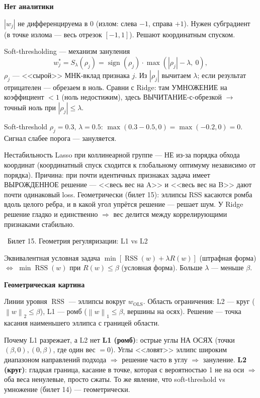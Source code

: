 \documentclass[12pt, a4paper]{article}
\newcommand{\bilet}[2]{%
  \vspace{10pt}%
  \noindent\colorbox{qcolor}{\parbox{\dimexpr\linewidth-2\fboxsep\relax}{%
    \color{white}\large\bfseries\strut\ Билет #1. #2%
  }}%
  \nopagebreak\vspace{5pt}\par\nopagebreak%
}
\newcommand{\qsub}[1]{%
  \vspace{5pt}%
  {\bfseries\color{defblue} #1}%
  \par\vspace{2pt}%
}
\newcommand{\sign}{\operatorname{sign}}
\newcommand{\RSS}{\operatorname{RSS}}
\newcommand{\norm}[1]{\left\lVert #1 \right\rVert}
\begin{document}
\qsub{Нет аналитики}
$|w_j|$ не дифференцируема в $0$ (излом: слева $-1$, справа $+1$). Нужен субградиент (в точке излома --- весь отрезок $[-1,1]$). Решают координатным спуском.

\begin{propbox}{Soft-thresholding --- механизм зануления}
\[
  w_j^* = S_\lambda(\rho_j) = \sign(\rho_j)\cdot\max(|\rho_j| - \lambda,\ 0),
\]
$\rho_j$ --- <<сырой>> МНК-вклад признака $j$. Из $|\rho_j|$ вычитаем $\lambda$; если результат отрицателен --- обрезаем в ноль. Сравни с Ridge: там УМНОЖЕНИЕ на коэффициент $< 1$ (ноль недостижим), здесь ВЫЧИТАНИЕ-с-обрезкой $\to$ точный ноль при $|\rho_j| \le \lambda$.
\end{propbox}

\begin{exbox}{Soft-threshold}
$\rho_j = 0.3$, $\lambda = 0.5$: $\max(0.3 - 0.5, 0) = \max(-0.2, 0) = 0$. Сигнал слабее порога --- зануляется.
\end{exbox}

\begin{fishkabox}
Нестабильность Lasso при коллинеарной группе --- НЕ из-за порядка обхода координат (координатный спуск сходится к глобальному оптимуму независимо от порядка). Причина: при почти идентичных признаках задача имеет ВЫРОЖДЕННОЕ решение --- <<весь вес на A>> и <<весь вес на B>> дают почти одинаковый loss. Геометрически (билет 15): эллипсы RSS касаются ромба вдоль целого ребра, и в какой угол упрётся решение --- решает шум. У Ridge решение гладко и единственно $\Rightarrow$ вес делится между коррелирующими признаками стабильно.
\end{fishkabox}

\bilet{15}{Геометрия регуляризации: L1 vs L2}

\begin{propbox}{Эквивалентная условная задача}
$\min[\RSS(w) + \lambda R(w)]$ (штрафная форма) $\Leftrightarrow$ $\min \RSS(w)$ при $R(w) \le \beta$ (условная форма). Больше $\lambda$ --- меньше $\beta$.
\end{propbox}

\qsub{Геометрическая картина}
Линии уровня $\RSS$ --- эллипсы вокруг $w_{\text{OLS}}$. Область ограничения: L2 --- круг ($\norm{w}_2 \le \beta$), L1 --- ромб ($\norm{w}_1 \le \beta$, вершины на осях). Решение --- точка касания наименьшего эллипса с границей области.

\begin{propbox}{Почему L1 разрежает, а L2 нет}
\textbf{L1 (ромб)}: острые углы НА ОСЯХ (точки $(\beta,0), (0,\beta)$, где один вес $= 0$). Углы <<ловят>> эллипс широким диапазоном направлений подхода $\Rightarrow$ решение часто в углу $\Rightarrow$ зануление. \textbf{L2 (круг)}: гладкая граница, касание в точке, которая с вероятностью 1 не на оси $\Rightarrow$ оба веса ненулевые, просто сжаты. То же явление, что soft-threshold vs умножение (билет 14) --- геометрически.
\end{propbox}
\end{document}
